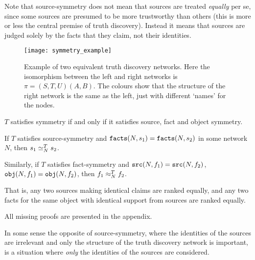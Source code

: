 \documentclass[../main.tex]{subfiles}
\begin{document}
Note that source-symmetry does not mean that sources are treated \emph{equally}
per se, since some sources are presumed to be more trustworthy than others
(this is more or less the central premise of truth discovery). Instead it means
that sources are judged solely by the facts that they claim, not their
identities.

\begin{figure}
    \centering
    \texttt{[image: symmetry\_example]}
    \caption{
        Example of two equivalent truth discovery networks. Here the
        isomorphism between the left and right networks is $\pi = (S, T, U)(A,
        B)$. The colours show that the structure of the right network is the
        same as the left, just with different `names' for the nodes.
    }
    \label{img:equivalent_networks}
\end{figure}

\begin{proposition}
\label{prop:symm_iff_fact_source_object_symm}
$T$ satisfies symmetry if and only if it satisfies source, fact and object
symmetry.
\end{proposition}

\begin{proposition}
\label{prop:same_facts_ranked_equally}
If $T$ satisfies source-symmetry and $\texttt{facts}(N, s_1) = \texttt{facts}(N, s_2)$ in some
network $N$, then $s_1 \simeq_N^T s_2$.

Similarly, if $T$ satisfies fact-symmetry and $\texttt{src}(N, f_1) = \texttt{src}(N, f_2)$,
$\texttt{obj}(N, f_1) = \texttt{obj}(N, f_2)$, then $f_1 \approx_N^T f_2$.

That is, any two sources making identical claims are ranked equally, and any
two facts for the same object with identical support from sources are ranked
equally.
\end{proposition}

All missing proofs are presented in the appendix.

In some sense the opposite of source-symmetry, where the identities of the
sources are irrelevant and only the structure of the truth discovery network is
important, is a situation where \emph{only} the identities of the sources are
considered.
\end{document}
